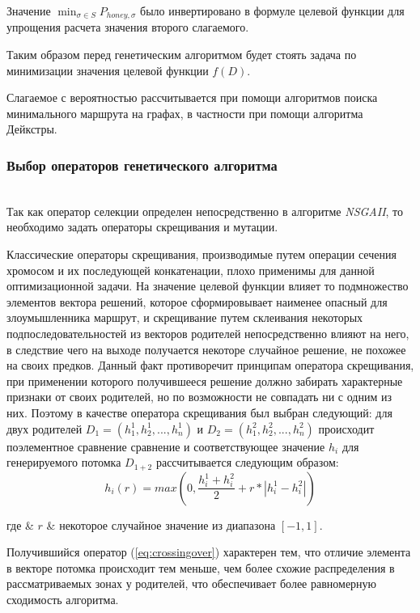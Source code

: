 Значение $\min_{\sigma \in S} P_{honey, \sigma}$ было инвертировано в формуле целевой функции для упрощения расчета значения второго слагаемого.

Таким образом перед генетическим алгоритмом будет стоять задача по минимизации значения целевой функции $f(D)$.

Слагаемое с вероятностью рассчитывается при помощи алгоритмов поиска минимального маршрута на графах, в частности при помощи алгоритма Дейкстры.

\subsubsection{Выбор операторов генетического алгоритма}\hspace*{\fill} \\

Так как оператор селекции определен непосредственно в алгоритме \textit{NSGAII}, то необходимо задать операторы скрещивания и мутации.

Классические операторы скрещивания, производимые путем операции сечения хромосом и их последующей конкатенации, плохо применимы для данной оптимизационной задачи. На значение целевой функции влияет то подмножество элементов вектора решений, которое сформировывает наименее опасный для злоумышленника маршрут, и скрещивание путем склеивания некоторых подпоследовательностей из векторов родителей непосредственно влияют на него, в следствие чего на выходе получается некоторе случайное решение, не похожее на своих предков. Данный факт противоречит принципам оператора скрещивания, при применении которого получившееся решение должно забирать характерные признаки от своих родителей, но по возможности не совпадать ни с одним из них. Поэтому в качестве оператора скрещивания был выбран следующий: для двух родителей $D_1 = (h_1^1, h_2^1, ..., h_n^1)$ и $D_2 = (h_1^2, h_2^2, ..., h_n^2)$ происходит поэлементное сравнение сравнение и соответствующее значение $h_i$ для генерируемого потомка $D_{1+2}$ рассчитывается следующим образом:
\begin{equation}
\label{eq:crossingover}
h_i(r) = max(0, \frac{h_i^1 + h_i^2}{2} + r * |h_i^1 - h_i^2|)
\end{equation}
\begin{explanation}
где & $r$ & некоторое случайное значение из диапазона $[-1,1]$.
\end{explanation}

Получившийся оператор (\ref{eq:crossingover}) характерен тем, что отличие элемента в векторе потомка происходит тем меньше, чем более схожие распределения в рассматриваемых зонах у родителей, что обеспечивает более равномерную сходимость алгоритма.

